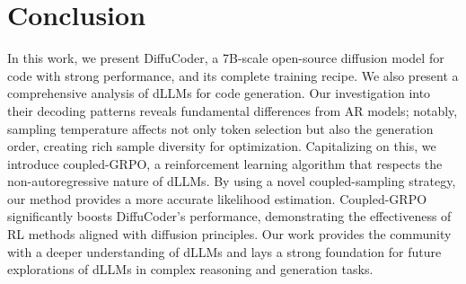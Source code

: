 \section{Conclusion}

In this work, we present DiffuCoder, a 7B-scale open-source diffusion model for code with strong performance, and its complete training recipe. We also present a comprehensive analysis of dLLMs for code generation. 
Our investigation into their decoding patterns reveals fundamental differences from AR models; notably, sampling temperature affects not only token selection but also the generation order, creating rich sample diversity for optimization. 
Capitalizing on this, we introduce coupled-GRPO, a reinforcement learning algorithm that respects the non-autoregressive nature of dLLMs. 
By using a novel coupled-sampling strategy, our method provides a more accurate likelihood estimation. 
Coupled-GRPO significantly boosts DiffuCoder's performance, demonstrating the effectiveness of RL methods aligned with diffusion principles. 
Our work provides the community with a deeper understanding of dLLMs and lays a strong foundation for future explorations of dLLMs in complex reasoning and generation tasks.